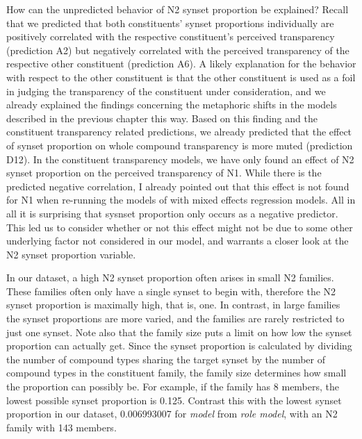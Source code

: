 How can the unpredicted behavior of N2 synset
proportion be explained? Recall that we predicted that both constituents' synset
proportions individually are 
positively correlated with the respective constituent's perceived
transparency (prediction A2) but negatively correlated with the
perceived transparency of the respective other constituent (prediction
A6). A likely explanation for the behavior with respect to the other
constituent is that the other constituent is used as a foil in judging
the transparency of the constituent under consideration, and we
already explained the findings concerning the metaphoric shifts in the
models described in the previous chapter this way. Based on this
finding and the constituent transparency related predictions, we
already predicted that the effect of synset proportion on whole
compound transparency is more muted (prediction D12). In the
constituent transparency models, we have only found an effect of N2
synset proportion on the perceived transparency of N1. While there is
the predicted negative correlation, I already pointed out that this effect is not found for N1 
when
re-running the models of \citet{BellandSchaefer:2013} with mixed
effects regression models. \enlargethispage{1\baselineskip}
All in
all it is surprising that sysnset proportion only occurs as a negative
predictor. This led us to consider whether or not this effect might
not be due to some other underlying factor not considered in our
model, and warrants a closer look at the N2 synset proportion
variable.

In our dataset, a high N2 synset proportion often arises in small N2
families. These families often  only have a single synset to
begin with, therefore the N2 synset proportion is maximally high, that
is, one. 
In contrast,
in large families the synset proportions are more varied, and the
families are rarely restricted to just one synset. Note also that the
family size puts a limit on how low the synset proportion can actually
get. Since the synset proportion is calculated by dividing the number
of compound types sharing the target synset by the number of compound
types in the constituent family, the family size determines how small
the proportion can possibly be. For example, if the family has 8 members, the lowest possible synset
proportion is 0.125. Contrast this with the lowest
synset proportion in our dataset, 0.006993007 for \emph{model} from
\emph{role model}, with an N2 family with 143 members. 

